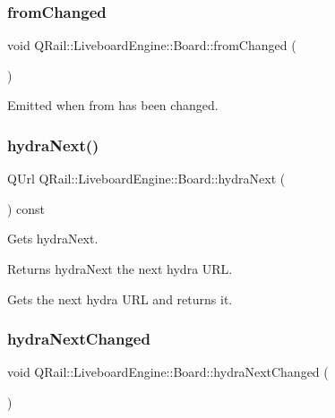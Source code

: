 \subsubsection{\texorpdfstring{fromChanged}{fromChanged}}
{\footnotesize\ttfamily void Q\+Rail\+::\+Liveboard\+Engine\+::\+Board\+::from\+Changed (\begin{DoxyParamCaption}{ }\end{DoxyParamCaption})\hspace{0.3cm}{\ttfamily [signal]}}



Emitted when from has been changed. 

\mbox{\label{classQRail_1_1LiveboardEngine_1_1Board_a0ed5cfc1cc0b6584bf087f936f60dcab}} 
\subsubsection{\texorpdfstring{hydraNext()}{hydraNext()}}
{\footnotesize\ttfamily Q\+Url Q\+Rail\+::\+Liveboard\+Engine\+::\+Board\+::hydra\+Next (\begin{DoxyParamCaption}{ }\end{DoxyParamCaption}) const}



Gets hydra\+Next. 

\begin{DoxyReturn}{Returns}
hydra\+Next the next hydra U\+RL.
\end{DoxyReturn}
Gets the next hydra U\+RL and returns it. \mbox{\label{classQRail_1_1LiveboardEngine_1_1Board_a775b5fd9886b209fc9ccdcdbbd206261}} 
\subsubsection{\texorpdfstring{hydraNextChanged}{hydraNextChanged}}
{\footnotesize\ttfamily void Q\+Rail\+::\+Liveboard\+Engine\+::\+Board\+::hydra\+Next\+Changed (\begin{DoxyParamCaption}{ }\end{DoxyParamCaption})\hspace{0.3cm}{\ttfamily [signal]}}



